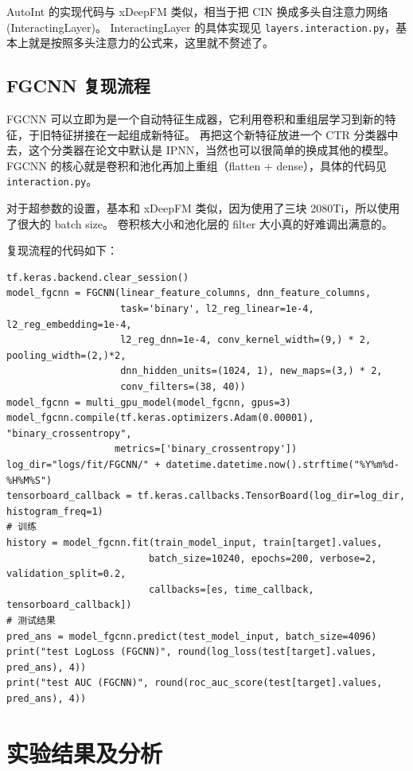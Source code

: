 \documentclass[degree=project,degree-type=project,cjk-font=noto]{thuthesis}
\begin{document}
AutoInt 的实现代码与 xDeepFM 类似，相当于把 CIN 换成多头自注意力网络(InteractingLayer)。
InteractingLayer 的具体实现见 \texttt{layers.interaction.py}，基本上就是按照多头注意力的公式来，这里就不赘述了。

\section{FGCNN 复现流程}
\label{sec:fgcnn_reproduce}

FGCNN 可以立即为是一个自动特征生成器，它利用卷积和重组层学习到新的特征，于旧特征拼接在一起组成新特征。
再把这个新特征放进一个 CTR 分类器中去，这个分类器在论文中默认是 IPNN，当然也可以很简单的换成其他的模型。
FGCNN 的核心就是卷积和池化再加上重组（flatten + dense），具体的代码见 \texttt{interaction.py}。

对于超参数的设置，基本和 xDeepFM 类似，因为使用了三块 2080Ti，所以使用了很大的 batch size。
卷积核大小和池化层的 filter 大小真的好难调出满意的。

复现流程的代码如下：

  \begin{verbatim}
tf.keras.backend.clear_session()
model_fgcnn = FGCNN(linear_feature_columns, dnn_feature_columns,
                    task='binary', l2_reg_linear=1e-4, l2_reg_embedding=1e-4,
                    l2_reg_dnn=1e-4, conv_kernel_width=(9,) * 2, pooling_width=(2,)*2,
                    dnn_hidden_units=(1024, 1), new_maps=(3,) * 2,
                    conv_filters=(38, 40))
model_fgcnn = multi_gpu_model(model_fgcnn, gpus=3)
model_fgcnn.compile(tf.keras.optimizers.Adam(0.00001), "binary_crossentropy",
                   metrics=['binary_crossentropy'])
log_dir="logs/fit/FGCNN/" + datetime.datetime.now().strftime("%Y%m%d-%H%M%S")
tensorboard_callback = tf.keras.callbacks.TensorBoard(log_dir=log_dir, histogram_freq=1)
# 训练
history = model_fgcnn.fit(train_model_input, train[target].values,
                         batch_size=10240, epochs=200, verbose=2, validation_split=0.2,
                         callbacks=[es, time_callback, tensorboard_callback])
# 测试结果
pred_ans = model_fgcnn.predict(test_model_input, batch_size=4096)
print("test LogLoss (FGCNN)", round(log_loss(test[target].values, pred_ans), 4))
print("test AUC (FGCNN)", round(roc_auc_score(test[target].values, pred_ans), 4))
  \end{verbatim}

\chapter{实验结果及分析}
\label{chap:result}
\end{document}
